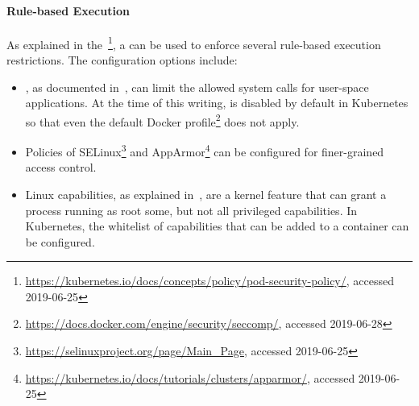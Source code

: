 \paragraph{Rule-based Execution}

As explained in the~\textcite{k8sdocs}\footnote{\url{https://kubernetes.io/docs/concepts/policy/pod-security-policy/}, accessed 2019-06-25}, a  can be used to enforce several rule-based execution restrictions. The configuration options include:

\begin{itemize}
    \item {}, as documented in~\textcite{seccompMan}, can limit the allowed system calls for user-space applications. At the time of this writing,  is disabled by default in Kubernetes so that even the default Docker profile\footnote{\url{https://docs.docker.com/engine/security/seccomp/}, accessed 2019-06-28} does not apply.
    \item Policies of SELinux\footnote{\url{https://selinuxproject.org/page/Main_Page}, accessed 2019-06-25} and AppArmor\footnote{\url{https://kubernetes.io/docs/tutorials/clusters/apparmor/}, accessed 2019-06-25} can be configured for finer-grained access control. 
    \item Linux capabilities, as explained in~\textcite{linuxCaps}, are a kernel feature that can grant a process running as root some, but not all privileged capabilities. In Kubernetes, the whitelist of capabilities that can be added to a container can be configured.
\end{itemize}

